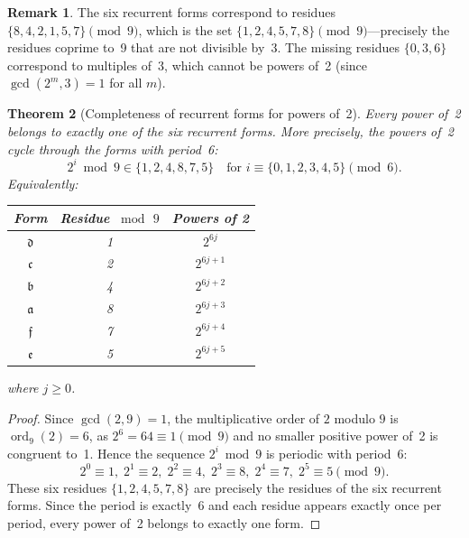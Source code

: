 \documentclass[11pt,a4paper]{article}
\theoremstyle{plain}
\newtheorem{theorem}{Theorem}[section]
\theoremstyle{definition}
\newtheorem{remark}[theorem]{Remark}
\DeclareMathOperator{\ord}{ord}
\begin{document}
\begin{remark}\label{rem:residues}
  The six recurrent forms correspond to residues $\{8, 4, 2, 1, 5, 7\} \pmod{9}$, which is the set $\{1, 2, 4, 5, 7, 8\} \pmod{9}$---precisely the residues coprime to~9 that are not divisible by~3. The missing residues $\{0, 3, 6\}$ correspond to multiples of~3, which cannot be powers of~2 (since $\gcd(2^m, 3) = 1$ for all $m$).
\end{remark}

\begin{theorem}[Completeness of recurrent forms for powers of~2]\label{thm:completeness}
  Every power of~2 belongs to exactly one of the six recurrent forms. More precisely, the powers of~2 cycle through the forms with period~6:
  \begin{equation}\label{eq:cycle}
    2^i \bmod 9 \in \{1, 2, 4, 8, 7, 5\} \quad \text{for } i \equiv \{0, 1, 2, 3, 4, 5\} \pmod{6}.
  \end{equation}
  Equivalently:
  \begin{center}
    \begin{tabular}{ccc}
      \toprule
      \textbf{Form} & \textbf{Residue} $\bmod\, 9$ & \textbf{Powers of 2} \\
      \midrule
      $\mathfrak{d}$ & 1 & $2^{6j}$ \\
      $\mathfrak{c}$ & 2 & $2^{6j+1}$ \\
      $\mathfrak{b}$ & 4 & $2^{6j+2}$ \\
      $\mathfrak{a}$ & 8 & $2^{6j+3}$ \\
      $\mathfrak{f}$ & 7 & $2^{6j+4}$ \\
      $\mathfrak{e}$ & 5 & $2^{6j+5}$ \\
      \bottomrule
    \end{tabular}
  \end{center}
  where $j \geq 0$.
\end{theorem}

\begin{proof}
  Since $\gcd(2,9) = 1$, the multiplicative order of $2$ modulo $9$ is $\ord_9(2) = 6$, as $2^6 = 64 \equiv 1 \pmod{9}$ and no smaller positive power of~2 is congruent to~1. Hence the sequence $2^i \bmod 9$ is periodic with period~6:
  \[
    2^0 \equiv 1,\; 2^1 \equiv 2,\; 2^2 \equiv 4,\; 2^3 \equiv 8,\; 2^4 \equiv 7,\; 2^5 \equiv 5 \pmod{9}.
  \]
  These six residues $\{1,2,4,5,7,8\}$ are precisely the residues of the six recurrent forms. Since the period is exactly~6 and each residue appears exactly once per period, every power of~2 belongs to exactly one form.
\end{proof}
\end{document}
